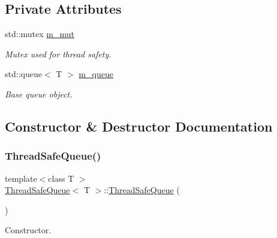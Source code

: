 \subsection*{Private Attributes}
\begin{DoxyCompactItemize}
\item 
std\+::mutex \hyperlink{class_thread_safe_queue_aed716c566c7091b8557118f29a1cf6ea}{m\+\_\+mut}
\begin{DoxyCompactList}\small\item\em Mutex used for thread safety. \end{DoxyCompactList}\item 
std\+::queue$<$ T $>$ \hyperlink{class_thread_safe_queue_a3b84a16818557f4aee11c1b810e3f953}{m\+\_\+queue}
\begin{DoxyCompactList}\small\item\em Base queue object. \end{DoxyCompactList}\end{DoxyCompactItemize}


\subsection{Constructor \& Destructor Documentation}
\mbox{\label{class_thread_safe_queue_a06e14823003cc9b5d9e9151380077f08}} 
\subsubsection{\texorpdfstring{Thread\+Safe\+Queue()}{ThreadSafeQueue()}\hspace{0.1cm}{\footnotesize\ttfamily [1/3]}}
{\footnotesize\ttfamily template$<$class T $>$ \\
\hyperlink{class_thread_safe_queue}{Thread\+Safe\+Queue}$<$ T $>$\+::\hyperlink{class_thread_safe_queue}{Thread\+Safe\+Queue} (\begin{DoxyParamCaption}{ }\end{DoxyParamCaption})}



Constructor. 

\mbox{\label{class_thread_safe_queue_a0f3f492104e38b019a5e1a74647cec39}} 

